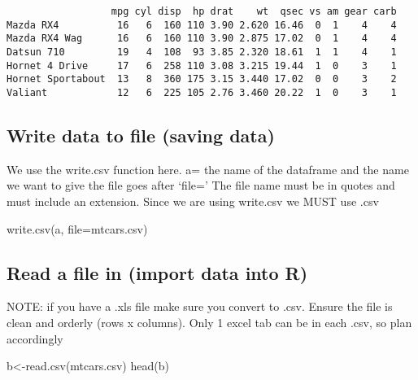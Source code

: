 \documentclass[
  letterpaper,
  DIV=11,
  numbers=noendperiod]{scrartcl}
\newenvironment{Shaded}{\begin{snugshade}}{\end{snugshade}}
\newcommand{\AttributeTok}[1]{\textcolor[rgb]{0.40,0.45,0.13}{#1}}
\newcommand{\FunctionTok}[1]{\textcolor[rgb]{0.28,0.35,0.67}{#1}}
\newcommand{\NormalTok}[1]{\textcolor[rgb]{0.00,0.23,0.31}{#1}}
\newcommand{\OtherTok}[1]{\textcolor[rgb]{0.00,0.23,0.31}{#1}}
\newcommand{\StringTok}[1]{\textcolor[rgb]{0.13,0.47,0.30}{#1}}
\begin{document}
\begin{verbatim}
                  mpg cyl disp  hp drat    wt  qsec vs am gear carb
Mazda RX4          16   6  160 110 3.90 2.620 16.46  0  1    4    4
Mazda RX4 Wag      16   6  160 110 3.90 2.875 17.02  0  1    4    4
Datsun 710         19   4  108  93 3.85 2.320 18.61  1  1    4    1
Hornet 4 Drive     17   6  258 110 3.08 3.215 19.44  1  0    3    1
Hornet Sportabout  13   8  360 175 3.15 3.440 17.02  0  0    3    2
Valiant            12   6  225 105 2.76 3.460 20.22  1  0    3    1
\end{verbatim}

\hypertarget{write-data-to-file-saving-data}{%
\subsection{\texorpdfstring{\textbf{Write data to file (saving
data)}}{Write data to file (saving data)}}\label{write-data-to-file-saving-data}}

We use the write.csv function here. a= the name of the dataframe and the
name we want to give the file goes after `file=' The file name must be
in quotes and must include an extension. Since we are using write.csv we
MUST use .csv

\begin{Shaded}
\begin{Highlighting}[]
\FunctionTok{write.csv}\NormalTok{(a, }\AttributeTok{file=}\StringTok{\textquotesingle{}mtcars.csv\textquotesingle{}}\NormalTok{)}
\end{Highlighting}
\end{Shaded}

\hypertarget{read-a-file-in-import-data-into-r}{%
\subsection{\texorpdfstring{\textbf{Read a file in (import data into
R)}}{Read a file in (import data into R)}}\label{read-a-file-in-import-data-into-r}}

NOTE: if you have a .xls file make sure you convert to .csv. Ensure the
file is clean and orderly (rows x columns). Only 1 excel tab can be in
each .csv, so plan accordingly

\begin{Shaded}
\begin{Highlighting}[]
\NormalTok{b}\OtherTok{\textless{}{-}}\FunctionTok{read.csv}\NormalTok{(}\StringTok{\textquotesingle{}mtcars.csv\textquotesingle{}}\NormalTok{)}
\FunctionTok{head}\NormalTok{(b)}
\end{Highlighting}
\end{Shaded}
\end{document}
